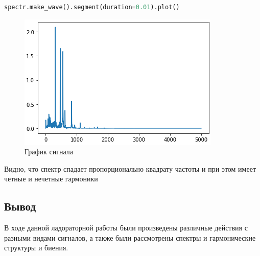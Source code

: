 \begin{lstlisting}[language=Python]
spectr.make_wave().segment(duration=0.01).plot()
\end{lstlisting}

\begin{figure}[H]
	\begin{center}
		\includegraphics[scale=1]{fig/lab02/lab2_12.png}
		\caption{График сигнала}
	\end{center}
\end{figure}

Видно, что спектр спадает пропорционально квадрату частоты и при этом имеет четные и нечетные гармоники

\subsection{Вывод}

В ходе данной ладораторной работы были произведены различные действия с разными видами сигналов, а также были рассмотрены спектры и гармонические структуры и биения.
